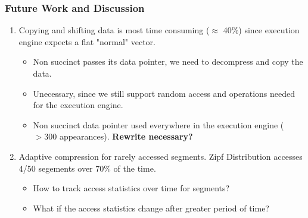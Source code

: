 \documentclass{beamer}
\begin{document}
\begin{frame}
    \frametitle{Future Work and Discussion}

    \begin{enumerate}

    \item Copying and shifting data is most time consuming ($\approx$ 40\%) since execution engine expects a 
    flat "normal" vector.
    \begin{itemize}
        \item Non succinct passes its data pointer, we need to decompress and copy the data.
        \item Unecessary, since we still support random access and operations needed for the execution engine.
        \item Non succinct data pointer used everywhere in the execution engine ($>300$ appearances). 
        \textbf{Rewrite necessary?}
    \end{itemize}

    \vspace{0.3cm} 

    \item Adaptive compression for rarely accessed segments. 
    Zipf Distribution accesses 4/50 segements over $70\%$ of the time.
    \begin{itemize}
        \item How to track access statistics over time for segments?
        \item What if the access statistics change after greater period of time?
    \end{itemize}
\end{enumerate}

\end{frame}
\end{document}
